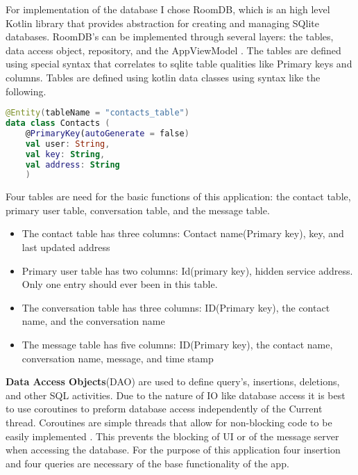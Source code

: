 \documentclass[../main/main.tex]{subfiles}
\begin{document}

For implementation of the database I chose RoomDB, which is an high level Kotlin library that provides abstraction for creating and managing SQlite databases. 
RoomDB's can be implemented through several layers: the tables, data access object, repository, and the AppViewModel \cite{ROOM}.
The tables are defined using special syntax that correlates to sqlite table qualities like Primary keys and columns. 
Tables are defined using kotlin data classes using syntax like the following.


\begin{lstlisting}[caption={Example of table definition.}, label={lst:example1}, language=Kotlin]
@Entity(tableName = "contacts_table")
data class Contacts (
    @PrimaryKey(autoGenerate = false)
    val user: String,
    val key: String,
    val address: String
    )
\end{lstlisting}

Four tables are need for the basic functions of this application: the contact table, primary user table, conversation table, and the message table.
\begin{itemize}
\item{The contact table has three columns: Contact name(Primary key), key, and last updated address}
\item{Primary user table has two columns: Id(primary key), hidden service address.
	Only one entry should ever been in this table.	
	}
\item{The conversation table has three columns: ID(Primary key), the contact name, and the conversation name}
\item{The message table has five columns: ID(Primary key), the contact name, conversation name, message, and time stamp}
\end{itemize}

\textbf{Data Access Objects}(DAO) are used to define query's, insertions, deletions, and other SQL activities. 
Due to the nature of IO like database access it is best to use coroutines to preform database access independently of the Current thread. 
Coroutines are simple threads that allow for non-blocking code to be easily implemented \cite{CO}. 
This prevents the blocking of UI or of the message server when accessing the database. 
For the purpose of this application four insertion and four queries are necessary of the base functionality of the app.
\end{document}

